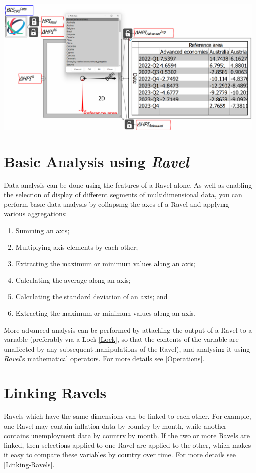 \includegraphics[width=15cm]{images/tut07SeparatingAdvancedAverage}

\section{Basic Analysis using \emph{Ravel}}

Data analysis can be done using the features of a Ravel alone. As
well as enabling the selection of display of different segments of
multidimensional data, you can perform basic data analysis by collapsing
the axes of a Ravel and applying various aggregations:
\begin{enumerate}
\item Summing an axis;
\item Multiplying axis elements by each other;
\item Extracting the maximum or minimum values along an axis; 
\item Calculating the average along an axis;
\item Calculating the standard deviation of an axis; and
\item Extracting the maximum or minimum values along an axis.
\end{enumerate}
More advanced analysis can be performed by attaching the output of
a Ravel to a variable (preferably via a Lock \ref{Lock}, so that
the contents of the variable are unaffected by any subsequent manipulations
of the Ravel), and analysing it using \emph{Ravel}'s mathematical
operators. For more details see \ref{Operations}.

\section{Linking Ravels}

Ravels which have the same dimensions can be linked to each other.
For example, one Ravel may contain inflation data by country by month,
while another contains unemployment data by country by month. If the
two or more Ravels are linked, then selections applied to one Ravel
are applied to the other, which makes it easy to compare these variables
by country over time. For more details see \ref{Linking-Ravels}.

